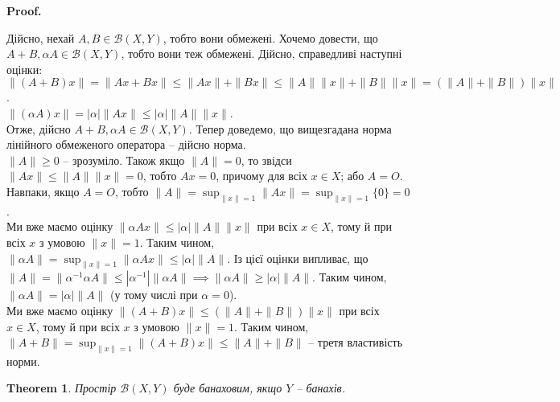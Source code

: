 \documentclass[a4paper, 10pt]{article}
\makeatletter
\theoremstyle{theoremdd}
\newtheorem{theorem}{Theorem}[subsection]
\theoremstyle{theoremdd}
\theoremstyle{theoremdd}
\theoremstyle{theoremdd}
\theoremstyle{theoremdd}
\theoremstyle{theoremdd}
\theoremstyle{theoremdd}
\theoremstyle{theoremdd}
\renewenvironment{proof}[1][Proof.\\]{\par
\pushQED{\hfill \qed}%
\normalfont \topsep6\p@\@plus6\p@\relax
\trivlist
\item\relax
{\bfseries
#1\@addpunct{.}}\hspace\labelsep\ignorespaces
}{%
\popQED\endtrivlist\@endpefalse
}
\makeatother
\begin{document}
\begin{proof}
Дійсно, нехай $A,B \in \mathcal{B}(X,Y)$, тобто вони обмежені. Хочемо довести, що $A+B, \alpha A \in \mathcal{B}(X,Y)$, тобто вони теж обмежені. Дійсно, справедливі наступні оцінки:\\
$\| (A+B) x \| = \| Ax + Bx \| \leq \|Ax \| + \|Bx\| \leq \|A\| \|x\| + \|B\| \|x \| = (\|A\| + \|B\|) \|x\|$.\\
$\| (\alpha A) x \| = |\alpha| \|Ax\| \leq |\alpha| \|A\| \|x\|$.\\
Отже, дійсно $A+B, \alpha A \in \mathcal{B}(X,Y)$. Тепер доведемо, що вищезгадана норма лінійного обмеженого оператора -- дійсно норма.\\
$\|A\| \geq 0$ -- зрозуміло. Також якщо $\|A\| = 0$, то звідси $\|Ax\| \leq \|A\| \|x\| = 0$, тобто $Ax = 0$, причому для всіх $x \in X$; або $A = O$. Навпаки, якщо $A = O$, тобто $\|A\| = \displaystyle\sup_{\|x\| = 1} \|Ax\| = \sup_{\|x\|= 1} \{0\} = 0$.\\
Ми вже маємо оцінку $\| \alpha Ax\| \leq |\alpha| \|A\| \|x\|$ при всіх $x \in X$, тому й при всіх $x$ з умовою $\|x\| = 1$. Таким чином, $\|\alpha A\| = \displaystyle\sup_{\|x\|= 1} \|\alpha Ax\| \leq |\alpha|\|A\|$. Із цієї оцінки випливає, що $\|A\| = \|\alpha^{-1} \alpha A\| \leq |\alpha^{-1}| \|\alpha A\| \implies \|\alpha A\| \geq |\alpha| \|A\|$. Таким чином, $\|\alpha A\| = |\alpha| \|A\|$ (у тому числі при $\alpha = 0$).\\
Ми вже маємо оцінку $\| (A+B) x\| \leq (\|A\| + \|B\|) \|x\|$ при всіх $x \in X$, тому й при всіх $x$ з умовою $\|x\| = 1$. Таким чином, $\|A+B\| = \displaystyle\sup_{\|x\| = 1} \|(A+B)x\| \leq \|A\| + \|B\|$ -- третя властивість норми.
\end{proof}

\begin{theorem}
Простір $\mathcal{B}(X,Y)$ буде банаховим, якщо $Y$ -- банахів.
\end{theorem}
\end{document}
